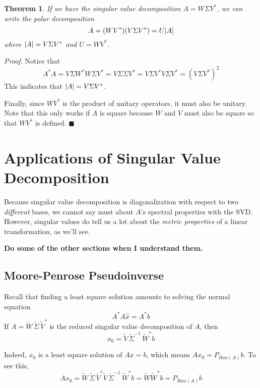 \documentclass[a4paper,10pt]{book}
\theoremstyle{plain}
\newtheorem{theorem}{Theorem}[section]
\renewenvironment{proof}{\textsl{Proof.}}{\hfill$\blacksquare$}
\theoremstyle{plain}
\theoremstyle{definition}
\begin{document}
\begin{theorem}
If we have the singular value decomposition $A = W \Sigma V^{*}$, we can write the polar decomposition
$$A = (WV^{*}) (V \Sigma V^{*}) = U \lvert A\rvert$$
where $\lvert A\rvert = V \Sigma V^{*}$ and $U = WV^{*}$. 
\end{theorem}

\begin{proof}
Notice that 
$$A^{*} A = V \Sigma W^{*} W \Sigma V^{*} = V \Sigma \Sigma V^{*} = V \Sigma V^{*} V \Sigma V^{*} = (V \Sigma V^{*})^{2}$$
This indicates that $\lvert A\rvert = V \Sigma V^{*}$. 

Finally, since $WV^{*}$ is the product of unitary operators, it must also be unitary. Note that this only works if $A$ is square because $W$ and $V$ must also be square so that $WV^{*}$ is defined. 
\end{proof}

\section{Applications of Singular Value Decomposition}

Because singular value decomposition is diagonalization with respect to two \textit{different} bases, we cannot say must about $A$'s spectral properties with the SVD. However, singular values do tell us a lot about the \textit{metric properties} of a linear transformation, as we'll see. 

\textbf{Do some of the other sections when I understand them.}

\subsection{Moore-Penrose Pseudoinverse}

Recall that finding a least square solution amounts to solving the normal equation 
$$A^{*} A \hat{x} = A^{*} b$$
If $A = \widetilde{W} \, \widetilde{\Sigma} \, \widetilde{V}^{*}$ is the reduced singular value decomposition of $A$, then 
$$ x_{0} = \widetilde{V} \, \widetilde{\Sigma}^{-1} \, \widetilde{W}^{*} b$$

Indeed, $x_{0}$ is a least square solution of $Ax = b$, which means $Ax_{0} = P_{Ran(A)} b$. To see this, 
$$Ax_{0} = \widetilde{W} \, \widetilde{\Sigma} \, \widetilde{V}^{*} \widetilde{V} \, \widetilde{\Sigma}^{-1} \, \widetilde{W}^{*} b = \widetilde{W} \widetilde{W}^{*} b = P_{Ran(A)} b $$
\end{document}
